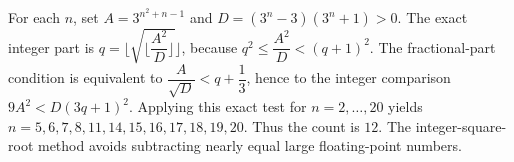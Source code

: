 For each $n$, set $A=3^{n^2+n-1}$ and $D=(3^n-3)(3^n+1)>0$. The exact integer part is $q = \lfloor \sqrt{\lfloor \dfrac{A^2}{D} \rfloor} \rfloor$, because $q^2 \le \dfrac{A^2}{D} < (q+1)^2$. The fractional-part condition is equivalent to $\dfrac{A}{\sqrt{D}} < q + \dfrac{1}{3}$, hence to the integer comparison $9A^2<D(3q+1)^2$. Applying this exact test for $n=2,\ldots,20$ yields $n=5,6,7,8,11,14,15,16,17,18,19,20$. Thus the count is $\boxed{12}$. The integer-square-root method avoids subtracting nearly equal large floating-point numbers.
